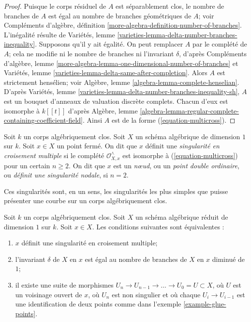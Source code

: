 \begin{proof}
Puisque le corps résiduel de $A$ est séparablement clos, le nombre de branches de $A$ est égal au nombre de branches géométriques de $A$; voir Compléments d'algèbre, définition \ref{more-algebra-definition-number-of-branches}. L'inégalité résulte de Variétés, lemme \ref{varieties-lemma-delta-number-branches-inequality}. Supposons qu'il y ait égalité. On peut remplacer $A$ par le complété de $A$; cela ne modifie ni le nombre de branches ni l'invariant $\delta$, d'après Compléments d'algèbre, lemme \ref{more-algebra-lemma-one-dimensional-number-of-branches} et Variétés, lemme \ref{varieties-lemma-delta-same-after-completion}. Alors $A$ est strictement hensélien; voir Algèbre, lemme \ref{algebra-lemma-complete-henselian}. D'après Variétés, lemme \ref{varieties-lemma-delta-number-branches-inequality-sh}, $A$ est un bouquet d'anneaux de valuation discrète complets. Chacun d'eux est isomorphe à $k[[t]]$ d'après Algèbre, lemme \ref{algebra-lemma-regular-complete-containing-coefficient-field}. Ainsi $A$ est de la forme (\ref{equation-multicross}).
\end{proof}

\begin{definition}
\label{definition-multicross}
Soit $k$ un corps algébriquement clos. Soit $X$ un schéma algébrique de dimension $1$ sur $k$. Soit $x \in X$ un point fermé. On dit que $x$ définit une {\it singularité en croisement multiple} si le complété $\mathcal{O}_{X, x}^\wedge$ est isomorphe à (\ref{equation-multicross}) pour un certain $n \geq 2$. On dit que $x$ est un {\it nœud}, ou un {\it point double ordinaire}, ou {\it définit une singularité nodale}, si $n = 2$.
\end{definition}

\noindent
Ces singularités sont, en un sens, les singularités les plus simples que puisse présenter une courbe sur un corps algébriquement clos.

\begin{lemma}
\label{lemma-multicross}
Soit $k$ un corps algébriquement clos. Soit $X$ un schéma algébrique réduit de dimension $1$ sur $k$. Soit $x \in X$. Les conditions suivantes sont équivalentes : \begin{enumerate} \item $x$ définit une singularité en croisement multiple; \item l'invariant $\delta$ de $X$ en $x$ est égal au nombre de branches de $X$ en $x$ diminué de $1$; \item il existe une suite de morphismes $U_n \to U_{n - 1} \to \ldots \to U_0 = U \subset X$, où $U$ est un voisinage ouvert de $x$, où $U_n$ est non singulier et où chaque $U_i \to U_{i - 1}$ est une identification de deux points comme dans l'exemple \ref{example-glue-points}.
\end{enumerate}
\end{lemma}

